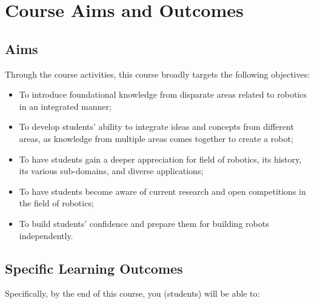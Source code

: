 \documentclass[a4paper]{article}
\begin{document}
\section{Course Aims and Outcomes}
\subsection{Aims}
Through the course activities, this course broadly targets the following objectives:
\begin{itemize}
	\item To introduce foundational knowledge from disparate areas related to robotics in an integrated manner;
	\item To develop students' ability to integrate ideas and concepts from different areas, as knowledge from multiple areas comes together to create a robot;
	\item To have students gain a deeper appreciation for field of robotics, its history, its various sub-domains, and diverse applications;
	\item To have students become aware of current research and open competitions in the field of robotics;
	\item To build students' confidence and prepare them for building robots independently.
\end{itemize}

\subsection{Specific Learning Outcomes}
Specifically, by the end of this course, you (students) will be able to:\\
\end{document}
